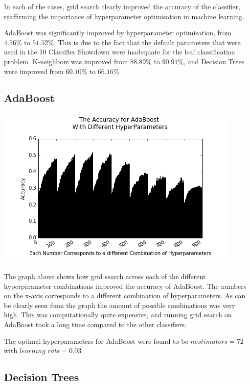 \documentclass{article}
\begin{document}
In each of the cases, grid search clearly improved the accuracy of the classifier, reaffirming the importance of hyperparameter optimisation in machine learning. 

AdaBoost was significantly improved by hyperparameter optimisation, from $4.56\%$ to $51.52\%$. This is due to the fact that the default parameters that were used in the 10 Classifier Showdown \cite{showdown} were inadequate for the leaf classification problem. K-neighbors was improved from $88.89\%$ to $90.91\%$, and Decision Trees were improved from $60.10\%$ to $66.16\%$. 

\subsection{AdaBoost}

\includegraphics[scale=0.6]{adaboost_crop}

The graph above shows how grid search across each of the different hyperparameter combinations improved the accuracy of AdaBoost. The numbers on the x-axis corresponds to a different combination of hyperparameters. As can be clearly seen from the graph the amount of possible combinations was very high. This was computationally quite expensive, and running grid search on AdaBoost took a long time compared to the other classifiers. 

The optimal hyperparameters for AdaBoost were found to be $n$\textunderscore $estimators = 72$ with $learning$ \textunderscore $rate = 0.03$

\subsection{Decision Trees}
\end{document}
